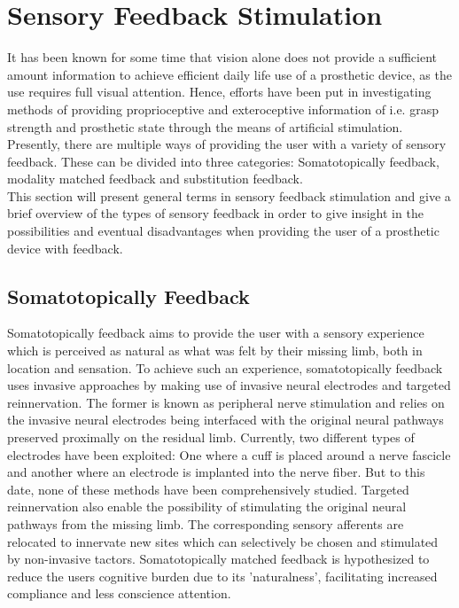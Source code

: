 \section{Sensory Feedback Stimulation} \label{SFS}

It has been known for some time that vision alone does not provide a sufficient amount information to achieve efficient daily life use of a prosthetic device, as the use requires full visual attention. Hence, efforts have been put in investigating methods of providing proprioceptive and exteroceptive information of i.e. grasp strength and prosthetic state through the means of artificial stimulation. \cite{Schofield2014,Stephens-Fripp2018} Presently, there are multiple ways of providing the user with a variety of sensory feedback. These can be divided into three categories: Somatotopically feedback, modality matched feedback and substitution feedback. \cite{Schofield2014} \\
This section will present general terms in sensory feedback stimulation and give a brief overview of the types of sensory feedback in order to give insight in the possibilities and eventual disadvantages when providing the user of a prosthetic device with feedback.

\subsection{Somatotopically Feedback}

Somatotopically feedback aims to provide the user with a sensory experience which is perceived as natural as what was felt by their missing limb, both in location and sensation. To achieve such an experience, somatotopically feedback uses invasive approaches by making use of invasive neural electrodes and targeted reinnervation. The former is known as peripheral nerve stimulation and relies on the invasive neural electrodes being interfaced with the original neural pathways preserved proximally on the residual limb. Currently, two different types of electrodes have been exploited: One where a cuff is placed around a nerve fascicle and another where an electrode is implanted into the nerve fiber. But to this date, none of these methods have been comprehensively studied. Targeted reinnervation also enable the possibility of stimulating the original neural pathways from the missing limb. The corresponding sensory afferents are relocated to innervate new sites which can selectively be chosen and stimulated by non-invasive tactors. Somatotopically matched feedback is hypothesized to reduce the users cognitive burden due to its 'naturalness', facilitating increased compliance and less conscience attention. \cite{Schofield2014}  

